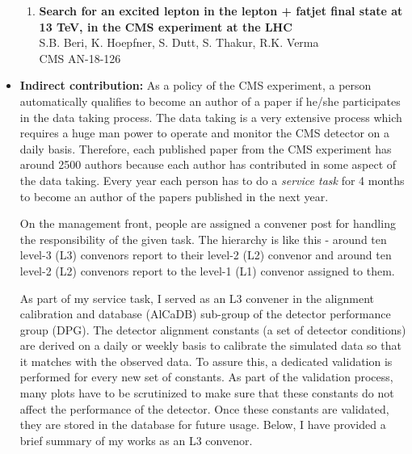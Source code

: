 \begin{itemize}[leftmargin=*]
{\begin{enumerate}[leftmargin=*]
\item
{\bf {Search for an excited lepton in the lepton + fatjet final state at 13 TeV, 
in the CMS experiment at the LHC}}
  \\{}S.B. Beri, K. Hoepfner, S. Dutt, S. Thakur, R.K. Verma
  \\{} CMS AN-18-126
\end{enumerate}
}

\item {\textbf{Indirect contribution:}
As a policy of the CMS experiment, a person automatically qualifies to become an author of a paper
if he/she participates in the data taking process. The data taking is a very extensive
process which requires a huge man power to operate and monitor the CMS detector on a daily basis. Therefore, each published paper from the CMS experiment has around 2500 authors because each author has contributed in some aspect of the data taking. Every year each person has to do a \textit{service task} for 4 months to become an author of the papers published in the next year. 

On the management front, people are assigned a convener post for handling the responsibility of the given task. The hierarchy is like this - around ten level-3 (L3) convenors report to their level-2 (L2) convenor and around ten level-2 (L2) convenors report to the level-1 (L1) convenor assigned to them.

As part of my service task, I served as an L3 convener in the alignment calibration and database (AlCaDB) sub-group of the detector performance group (DPG). The detector alignment constants (a set of detector conditions) are derived on a daily or weekly basis to calibrate the simulated data so that it matches with the observed data. To assure this, a dedicated validation is performed for every new set of constants. As part of the validation process, many  plots have to be scrutinized to make sure that these constants do not affect the performance of the detector. Once these constants are validated, they are stored in the database for future usage. Below, I have provided a brief summary of my works as an L3 convenor. 


}
\end{itemize}
